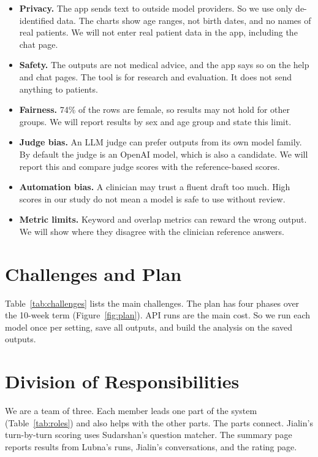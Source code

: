\documentclass[11pt]{article}
\begin{document}
\begin{itemize}
  \item \textbf{Privacy.} The app sends text to outside model providers. So we use only de-identified data. The charts show age ranges, not birth dates, and no names of real patients. We will not enter real patient data in the app, including the chat page.
  \item \textbf{Safety.} The outputs are not medical advice, and the app says so on the help and chat pages. The tool is for research and evaluation. It does not send anything to patients.
  \item \textbf{Fairness.} 74\% of the rows are female, so results may not hold for other groups. We will report results by sex and age group and state this limit.
  \item \textbf{Judge bias.} An LLM judge can prefer outputs from its own model family. By default the judge is an OpenAI model, which is also a candidate. We will report this and compare judge scores with the reference-based scores.
  \item \textbf{Automation bias.} A clinician may trust a fluent draft too much. High scores in our study do not mean a model is safe to use without review.
  \item \textbf{Metric limits.} Keyword and overlap metrics can reward the wrong output. We will show where they disagree with the clinician reference answers.
\end{itemize}

\section{Challenges and Plan}

Table~\ref{tab:challenges} lists the main challenges.
The plan has four phases over the 10-week term (Figure~\ref{fig:plan}).
API runs are the main cost.
So we run each model once per setting, save all outputs, and build the analysis on the saved outputs.


\section{Division of Responsibilities}

We are a team of three.
Each member leads one part of the system (Table~\ref{tab:roles}) and also helps with the other parts.
The parts connect.
Jialin's turn-by-turn scoring uses Sudarshan's question matcher.
The summary page reports results from Lubna's runs, Jialin's conversations, and the rating page.
\end{document}
